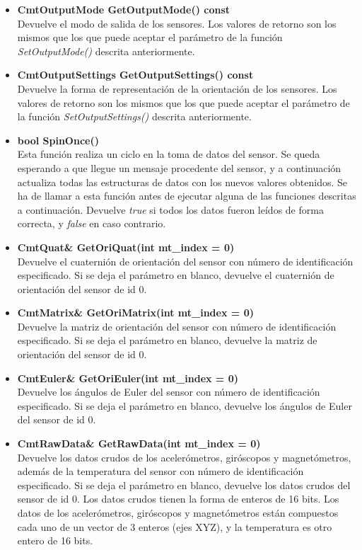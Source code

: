 \documentclass[12pt, a4paper]{report}
\begin{document}
\begin{itemize}
\begin{itemize}
		\item \textbf{CmtOutputMode GetOutputMode() const}\\
		Devuelve el modo de salida de los sensores. Los valores de retorno son los mismos que los que puede aceptar el parámetro de la función \textit{SetOutputMode()} descrita anteriormente.	
		
		\item \textbf{CmtOutputSettings GetOutputSettings() const}	\\
		Devuelve la forma de representación de la orientación de los sensores. Los valores de retorno son los mismos que los que puede aceptar el parámetro de la función \textit{SetOutputSettings()} descrita anteriormente.		
				
		\item \textbf{bool SpinOnce()}\\
		Esta función realiza un ciclo en la toma de datos del sensor. Se queda esperando a que llegue un mensaje procedente del sensor, y a continuación actualiza todas las estructuras de datos con los nuevos valores obtenidos. Se ha de llamar a esta función antes de ejecutar alguna de las funciones descritas a continuación. Devuelve \textit{true} si todos los datos fueron leídos de forma correcta, y \textit{false} en caso contrario.
		
		\item \textbf{CmtQuat\& GetOriQuat(int mt\_index = 0)}\\
		Devuelve el cuaternión de orientación del sensor con número de identificación especificado. Si se deja el parámetro en blanco, devuelve el cuaternión de orientación del sensor de id 0.
		
		\item \textbf{CmtMatrix\& GetOriMatrix(int mt\_index = 0)}\\
		Devuelve la matriz de orientación del sensor con número de identificación especificado. Si se deja el parámetro en blanco, devuelve la matriz de orientación del sensor de id 0.
		
		\item \textbf{CmtEuler\& GetOriEuler(int mt\_index = 0)}\\
		Devuelve los ángulos de Euler del sensor con número de identificación especificado. Si se deja el parámetro en blanco, devuelve los ángulos de Euler del sensor de id 0.
		
		\item \textbf{CmtRawData\& GetRawData(int mt\_index = 0)}\\
		Devuelve los datos crudos de los acelerómetros, giróscopos y magnetómetros, además de la temperatura del sensor con número de identificación especificado. Si se deja el parámetro en blanco, devuelve los datos crudos del sensor de id 0. Los datos crudos tienen la forma de enteros de 16 bits. Los datos de los acelerómetros, giróscopos y magnetómetros están compuestos cada uno de un vector de 3 enteros (ejes XYZ), y la temperatura es otro entero de 16 bits.	
		

\end{itemize}
\end{itemize}
\end{document}
